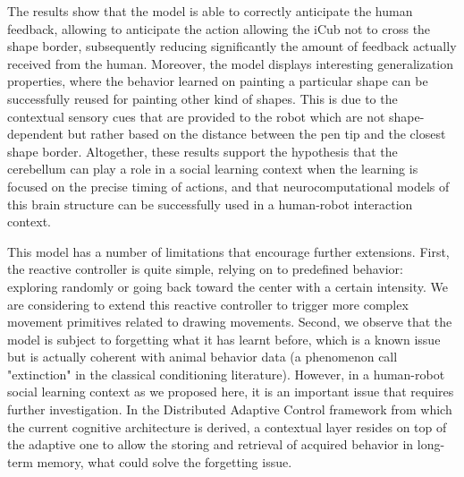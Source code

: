 \documentclass[letterpaper, 10 pt, conference]{ieeeconf}  %
\begin{document}
{The results show that the model is able to correctly anticipate the human feedback, allowing to anticipate the action allowing the iCub not to cross the shape border, subsequently reducing significantly the amount of feedback actually received from the human. Moreover, the model displays interesting generalization properties, where the behavior learned on painting a particular shape can be successfully reused for painting other kind of shapes. This is due to the contextual sensory cues that are provided to the robot which are not shape-dependent but rather based on the distance between the pen tip and the closest shape border. Altogether, these results support the hypothesis that the cerebellum can play a role in a social learning context when the learning is focused on the precise timing of actions, and that neurocomputational models of this brain structure can be successfully used in a human-robot interaction context.

This model has a number of limitations that encourage further extensions. First, the reactive controller is quite simple, relying on to predefined behavior: exploring randomly or going back toward the center with a certain intensity. We are considering to extend this reactive controller to trigger more complex movement primitives related to drawing movements.  Second, we observe that the model is subject to forgetting what it has learnt before, which is a known issue but is actually coherent with animal behavior data (a phenomenon call "extinction" in the classical conditioning literature). However, in a human-robot social learning context as we proposed here, it is an important issue that requires further investigation. In the Distributed Adaptive Control framework from which the current cognitive architecture is derived, a contextual layer resides on top of the adaptive one to allow the storing and retrieval of acquired behavior in long-term memory, what could solve the forgetting issue.

}
\end{document}
